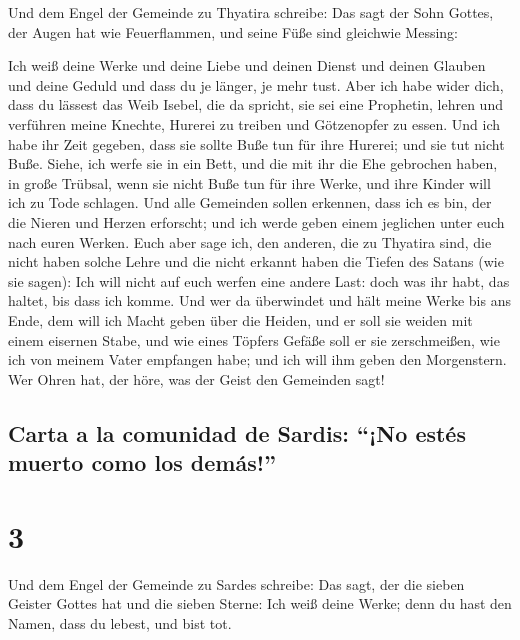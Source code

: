  Und dem Engel der Gemeinde zu Thyatira schreibe: Das
sagt der Sohn Gottes, der Augen hat wie Feuerflammen, und seine Füße
sind gleichwie Messing:

 Ich weiß deine Werke und deine Liebe und deinen Dienst
und deinen Glauben und deine Geduld und dass du je länger, je mehr tust.
 Aber ich habe wider dich, dass du lässest das Weib
Isebel, die da spricht, sie sei eine Prophetin, lehren und verführen
meine Knechte, Hurerei zu treiben und Götzenopfer zu essen.
 Und ich habe ihr Zeit gegeben, dass sie sollte Buße tun
für ihre Hurerei; und sie tut nicht Buße.  Siehe, ich
werfe sie in ein Bett, und die mit ihr die Ehe gebrochen haben, in große
Trübsal, wenn sie nicht Buße tun für ihre Werke,  und
ihre Kinder will ich zu Tode schlagen. Und alle Gemeinden sollen
erkennen, dass ich es bin, der die Nieren und Herzen erforscht; und ich
werde geben einem jeglichen unter euch nach euren Werken.
 Euch aber sage ich, den anderen, die zu Thyatira sind,
die nicht haben solche Lehre und die nicht erkannt haben die Tiefen des
Satans (wie sie sagen): Ich will nicht auf euch werfen eine andere Last:
 doch was ihr habt, das haltet, bis dass ich komme.
 Und wer da überwindet und hält meine Werke bis ans Ende,
dem will ich Macht geben über die Heiden,  und er soll
sie weiden mit einem eisernen Stabe, und wie eines Töpfers Gefäße soll
er sie zerschmeißen,  wie ich von meinem Vater empfangen
habe; und ich will ihm geben den Morgenstern.  Wer Ohren
hat, der höre, was der Geist den Gemeinden sagt!

\hypertarget{carta-a-la-comunidad-de-sardis-no-estuxe9s-muerto-como-los-demuxe1s}{%
\subsection{Carta a la comunidad de Sardis: ``¡No estés muerto como los
demás!''}\label{carta-a-la-comunidad-de-sardis-no-estuxe9s-muerto-como-los-demuxe1s}}

\hypertarget{section-2}{%
\section{3}\label{section-2}}

 Und dem Engel der Gemeinde zu Sardes schreibe: Das sagt,
der die sieben Geister Gottes hat und die sieben Sterne: Ich weiß deine
Werke; denn du hast den Namen, dass du lebest, und bist tot.

